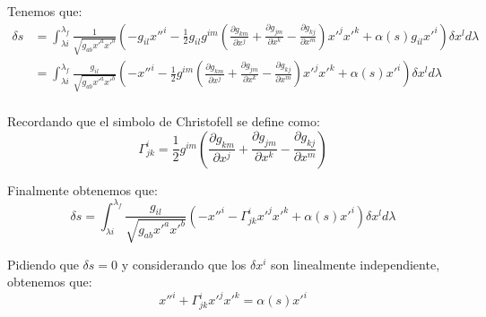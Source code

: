 \documentclass[paper=a4, fontsize=11pt,twoside]{scrartcl}
\begin{document}
Tenemos que:
	\begin{align*}
		\delta s &=  \int^{\lambda_{f}}_{\lambda{i}} \frac{1}{\sqrt{g_{ab}x'^{a}x'^{b}}} \left( - g_{il}x''^{i}
													-\frac{1}{2}g_{il}g^{im}\left( \frac{\partial g_{km}}{\partial x^{j}} + \frac{\partial g_{jm}}{\partial x^{k}}-\frac{\partial g_{kj}}{\partial x^{m}} \right)x'^{j}x'^{k}
				                                        + \alpha\left( s \right) g_{il}x'^{i} 
														\right) \delta x^{l}  d\lambda \\
			     &=  \int^{\lambda_{f}}_{\lambda{i}} \frac{g_{il}}{\sqrt{g_{ab}x'^{a}x'^{b}}} \left( - x''^{i}
													-\frac{1}{2}g^{im}\left( \frac{\partial g_{km}}{\partial x^{j}} + \frac{\partial g_{jm}}{\partial x^{k}}-\frac{\partial g_{kj}}{\partial x^{m}} \right)x'^{j}x'^{k}
				                                        + \alpha\left( s \right) x'^{i} 
														\right) \delta x^{l}  d\lambda \\																																												
	\end{align*}
	
Recordando que el simbolo de Christofell se define como:
	\begin{equation*}
		\Gamma^{i}_{jk} = \frac{1}{2} g^{im} \left( \frac{\partial g_{km}}{\partial x^{j}} + \frac{\partial g_{jm}}{\partial x^{k}}-\frac{\partial g_{kj}}{\partial x^{m}}    \right)
	\end{equation*}
	
Finalmente obtenemos que:
	\begin{equation*}
		\delta s =  \int^{\lambda_{f}}_{\lambda{i}} \frac{g_{il}}{\sqrt{g_{ab}x'^{a}x'^{b}}} \left( - x''^{i}
													-\Gamma^{i}_{jk} x'^{j}x'^{k} + \alpha\left( s \right) x'^{i} 
														\right) \delta x^{l}  d\lambda 																																											
	\end{equation*}
	
Pidiendo que $\delta s = 0$ y considerando que los $\delta x^{i}$ son linealmente independiente, obtenemos que:
	\begin{equation*}
		x''^{i} + \Gamma^{i}_{jk} x'^{j}x'^{k} = \alpha\left( s \right) x'^{i}
	\end{equation*}
\end{document}
